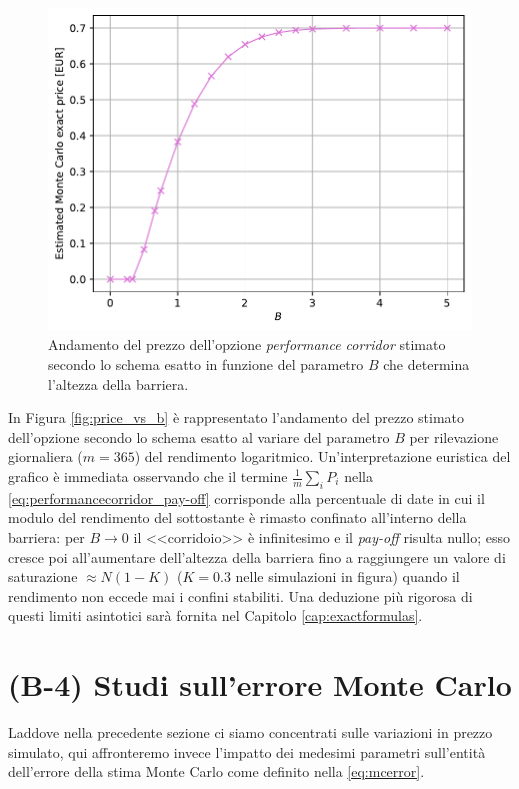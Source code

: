 \begin{figure}[t]
    \centering
    \includegraphics[scale=0.5]{graphs/OptionPriceVsB_PriceVsB_N200mln.pdf}
    \caption[Andamento del prezzo dell'opzione \textit{performance corridor} stimato secondo lo schema esatto in funzione del parametro $B$.]{Andamento del prezzo dell'opzione \textit{performance corridor} stimato secondo lo schema esatto in funzione del parametro $B$ che determina l'altezza della barriera.}
    \label{fig:price_vs_b}
\end{figure}

In Figura \eqref{fig:price_vs_b} è rappresentato l'andamento del prezzo stimato dell'opzione secondo lo schema esatto al variare del parametro $B$ per rilevazione giornaliera ($m=365$) del rendimento logaritmico. Un'interpretazione euristica del grafico è immediata osservando che il termine $\frac{1}{m} \sum_i P_i$ nella \eqref{eq:performancecorridor_pay-off} corrisponde alla percentuale di date in cui il modulo del rendimento del sottostante è rimasto confinato all'interno della barriera: per $B \rightarrow 0$ il <<corridoio>> è infinitesimo e il \textit{pay-off} risulta nullo; esso cresce poi all'aumentare dell'altezza della barriera fino a raggiungere un valore di saturazione $\approx N(1-K)$ ($K=0.3$ nelle simulazioni in figura) quando il rendimento non eccede mai i confini stabiliti. Una deduzione più rigorosa di questi limiti asintotici sarà fornita nel Capitolo \ref{cap:exactformulas}.


\section{(B-4) Studi sull'errore Monte Carlo} \label{sec:errorstudies}
Laddove nella precedente sezione ci siamo concentrati sulle variazioni in prezzo simulato, qui affronteremo invece l'impatto dei medesimi parametri sull'entità dell'errore della stima Monte Carlo come definito nella \eqref{eq:mcerror}.

